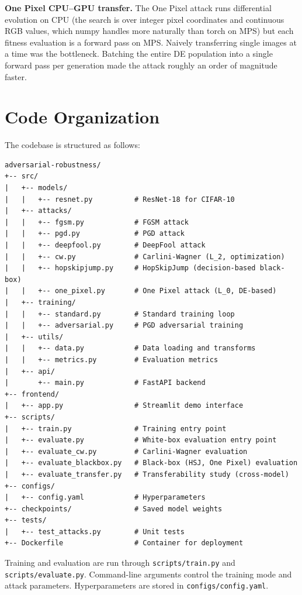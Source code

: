 \textbf{One Pixel CPU--GPU transfer.} The One Pixel attack runs differential evolution on CPU (the search is over integer pixel coordinates and continuous RGB values, which numpy handles more naturally than torch on MPS) but each fitness evaluation is a forward pass on MPS. Naively transferring single images at a time was the bottleneck. Batching the entire DE population into a single forward pass per generation made the attack roughly an order of magnitude faster.

\section{Code Organization}

The codebase is structured as follows:

\begin{verbatim}
adversarial-robustness/
+-- src/
|   +-- models/
|   |   +-- resnet.py          # ResNet-18 for CIFAR-10
|   +-- attacks/
|   |   +-- fgsm.py            # FGSM attack
|   |   +-- pgd.py             # PGD attack
|   |   +-- deepfool.py        # DeepFool attack
|   |   +-- cw.py              # Carlini-Wagner (L_2, optimization)
|   |   +-- hopskipjump.py     # HopSkipJump (decision-based black-box)
|   |   +-- one_pixel.py       # One Pixel attack (L_0, DE-based)
|   +-- training/
|   |   +-- standard.py        # Standard training loop
|   |   +-- adversarial.py     # PGD adversarial training
|   +-- utils/
|   |   +-- data.py            # Data loading and transforms
|   |   +-- metrics.py         # Evaluation metrics
|   +-- api/
|       +-- main.py            # FastAPI backend
+-- frontend/
|   +-- app.py                 # Streamlit demo interface
+-- scripts/
|   +-- train.py               # Training entry point
|   +-- evaluate.py            # White-box evaluation entry point
|   +-- evaluate_cw.py         # Carlini-Wagner evaluation
|   +-- evaluate_blackbox.py   # Black-box (HSJ, One Pixel) evaluation
|   +-- evaluate_transfer.py   # Transferability study (cross-model)
+-- configs/
|   +-- config.yaml            # Hyperparameters
+-- checkpoints/               # Saved model weights
+-- tests/
|   +-- test_attacks.py        # Unit tests
+-- Dockerfile                 # Container for deployment
\end{verbatim}

Training and evaluation are run through \texttt{scripts/train.py} and \texttt{scripts/\allowbreak evaluate.py}. Command-line arguments control the training mode and attack parameters. Hyperparameters are stored in \texttt{configs/config.yaml}.


